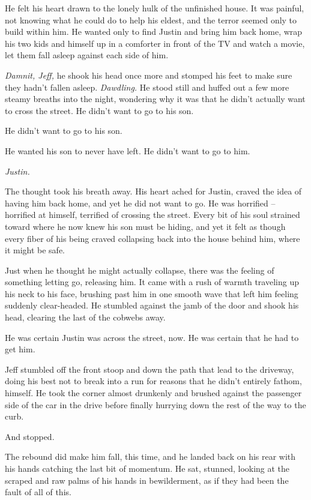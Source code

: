 He felt his heart drawn to the lonely hulk of the unfinished house.  It was painful, not knowing what he could do to help his eldest, and the terror seemed only to build within him.  He wanted only to find Justin and bring him back home, wrap his two kids and himself up in a comforter in front of the TV and watch a movie, let them fall asleep against each side of him.

\textit{Damnit, Jeff,} he shook his head once more and stomped his feet to make sure they hadn't fallen asleep.  \textit{Dawdling.}  He stood still and huffed out a few more steamy breaths into the night, wondering why it was that he didn't actually want to cross the street.  He didn't want to go to his son.

He didn't want to go to his son.

He wanted his son to never have left.  He didn't want to go to him.

\textit{Justin.}

The thought took his breath away.  His heart ached for Justin, craved the idea of having him back home, and yet he did not want to go.  He was horrified -- horrified at himself, terrified of crossing the street.  Every bit of his soul strained toward where he now knew his son must be hiding, and yet it felt as though every fiber of his being craved collapsing back into the house behind him, where it might be safe.

Just when he thought he might actually collapse, there was the feeling of something letting go, releasing him.  It came with a rush of warmth traveling up his neck to his face, brushing past him in one smooth wave that left him feeling suddenly clear-headed.  He stumbled against the jamb of the door and shook his head, clearing the last of the cobwebs away.

He was certain Justin was across the street, now.  He was certain that he had to get him.

\secdiv

Jeff stumbled off the front stoop and down the path that lead to the driveway, doing his best not to break into a run for reasons that he didn't entirely fathom, himself.  He took the corner almost drunkenly and brushed against the passenger side of the car in the drive before finally hurrying down the rest of the way to the curb.

And stopped.

The rebound did make him fall, this time, and he landed back on his rear with his hands catching the last bit of momentum.  He sat, stunned, looking at the scraped and raw palms of his hands in bewilderment, as if they had been the fault of all of this.

